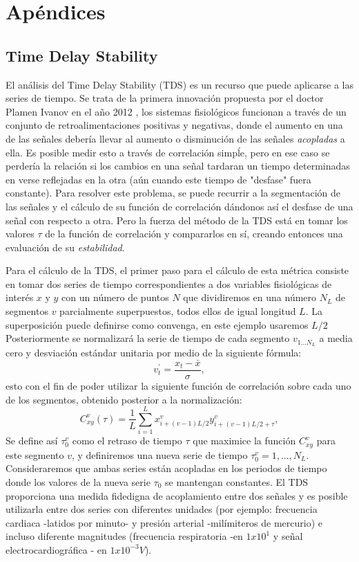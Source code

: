 \documentclass[twoside,twocolumn]{article}
\begin{document}
\section{Apéndices}
\subsection{Time Delay Stability}
El análisis del Time Delay Stability (TDS) es un recurso que puede aplicarse a las series de tiempo.
Se trata de la primera innovación propuesta por el doctor Plamen Ivanov en el año 2012 \cite{bashan2012network}, los sistemas fisiológicos funcionan a través de un conjunto de retroalimentaciones positivas y negativas, donde el aumento en una de las señales debería llevar al aumento o disminución de las señales \textit{acopladas} a ella. Es posible medir esto a través de correlación simpĺe, pero en ese caso se perdería la relación si los cambios en una señal tardaran un tiempo determinadas en verse reflejadas en la otra (aún cuando este tiempo de "desfase" fuera constante).
Para resolver este problema, se puede recurrir a la segmentación de las señales y el cálculo de su función de correlación dándonos así el desfase de una señal con respecto a otra. Pero la fuerza del método de la TDS está en tomar los valores $\tau$ de la función de correlación y compararlos en sí, creando entonces una evaluación de su \textit{estabilidad}.

Para el cálculo de la TDS, el primer paso para el cálculo de esta métrica consiste en tomar dos series de tiempo correspondientes a dos variables fisiológicas de interés $x$ y $y$ con un número de puntos $N$ que dividiremos en una número $N_L$ de segmentos $v$ parcialmente superpuestos, todos ellos de igual longitud $L$.
La superposición puede definirse como convenga, en este ejemplo usaremos $L/2$
Posteriormente se normalizará la serie de tiempo de cada segmento $v_{1...N_L}$ a media cero y desviación estándar unitaria por medio de la siguiente fórmula:
\begin{equation}
v^\prime_t = \frac{x_t-\bar{x}}{\sigma} ,
\end{equation}
esto con el fin de poder utilizar la siguiente función de correlación sobre cada uno de los segmentos, obtenido posterior a la normalización:
\begin{equation}
C^v_{xy}(\tau)=\frac{1}{L}\sum^L_{i=1}x^v_{i+(v-1)L/2}y^v_{i+(v-1)L/2+\tau} ,
\end{equation}
Se define así $\tau^v_0$ como el retraso de tiempo $\tau$ que maximice la función $C^v_{xy}$ para este segmento $v$, y definiremos una nueva serie de tiempo ${\tau^v_0}=1,...,N_L$.
Consideraremos que ambas series están acopladas en los periodos de tiempo donde los valores de la nueva serie $\tau_0$ se mantengan constantes.
El TDS proporciona una medida fidedigna de acoplamiento entre dos señales y es posible utilizarla entre dos series con diferentes unidades (por ejemplo: frecuencia cardiaca -latidos por minuto- y presión arterial -milímiteros de mercurio) e incluso diferente magnitudes (frecuencia respiratoria -en $1x10^1$ y señal electrocardiográfica - en $1x10^{-3}V$).
\end{document}
